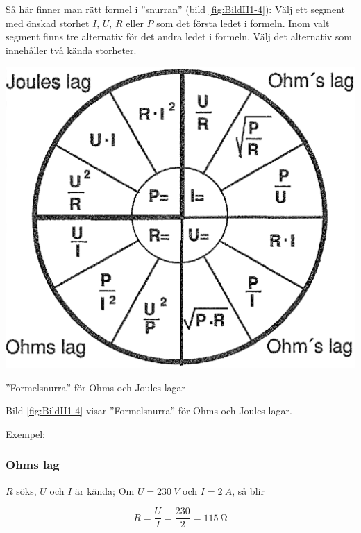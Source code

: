 Så här finner man rätt formel i ''snurran'' (bild \ref{fig:BildII1-4}):
Välj ett segment med önskad storhet \(I\), \(U\), \(R\) eller \(P\) som det
första ledet i formeln.
Inom valt segment finns tre alternativ för det andra ledet i formeln.
Välj det alternativ som innehåller två kända storheter.

\begin{marginfigure}
  \includegraphics[width=\textwidth]{images/cropped_pdfs/bild_2_1-04.pdf}
  \caption{''Formelsnurra'' för Ohms och Joules lagar}
  \label{fig:BildII1-4}
\end{marginfigure}

Bild \ref{fig:BildII1-4} visar ''Formelsnurra'' för Ohms och Joules lagar.

Exempel:

\subsubsection{Ohms lag}

\(R\) söks, \(U\) och \(I\) är kända;
Om \(U = \SI{230}{V}\) och \(I = \SI{2}{A}\), så blir

\begin{equation*}
  R=\dfrac{U}{I}=\dfrac{230}{2}=\SI{115}{\ohm}
\end{equation*}


